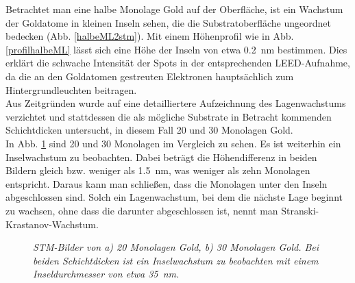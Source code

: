 Betrachtet man eine halbe Monolage Gold auf der Oberfläche, ist ein Wachstum der Goldatome in
kleinen Inseln sehen, die die Substratoberfläche ungeordnet bedecken (Abb. \ref{halbeML2stm}).
Mit einem Höhenprofil wie in Abb. \ref{profilhalbeML} lässt sich eine Höhe der Inseln von
etwa \SI{0,2}{nm} bestimmen. Dies erklärt die schwache Intensität der Spots in der entsprechenden
LEED-Aufnahme, da die an den Goldatomen gestreuten Elektronen hauptsächlich zum Hintergrundleuchten
beitragen.
\\
Aus Zeitgründen wurde auf eine detailliertere Aufzeichnung des Lagenwachstums
verzichtet und stattdessen die als mögliche Substrate in Betracht kommenden Schichtdicken untersucht, in diesem
Fall 20 und 30 Monolagen Gold.\\
In Abb. \ref{MLVergleich} sind 20 und 30 Monolagen im Vergleich zu sehen. Es ist weiterhin ein
Inselwachstum zu beobachten.  Dabei beträgt die Höhendifferenz in beiden Bildern gleich bzw. weniger
als \SI{1,5}{nm}, was weniger als zehn Monolagen entspricht. Daraus kann man schließen, dass die
Monolagen unter den Inseln abgeschlossen sind. Solch ein Lagenwachstum, bei dem die nächste Lage beginnt zu
wachsen, ohne dass die darunter abgeschlossen ist, nennt man Stranski-Krastanov-Wachstum.


\begin{figure}[htbp]
	\begin{minipage}[b]{0.5\textwidth} 
		\sffamily
		
	\end{minipage}
	\hfill
	\begin{minipage}[b]{0.5\textwidth}
		\sffamily
		
	\end{minipage}
	\caption{\textit{STM-Bilder von a) 20 Monolagen Gold, b) 30 Monolagen Gold. Bei beiden
	Schichtdicken ist ein Inselwachstum zu beobachten mit einem Inseldurchmesser von etwa \SI{35}{nm}.}}
	\label{MLVergleich} 
\end{figure}

